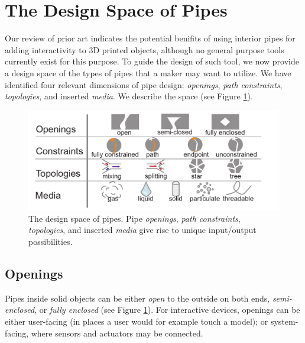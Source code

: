
\section{The Design Space of Pipes}
Our review of prior art indicates the potential benifits of using interior pipes for adding interactivity to 3D printed objects, although no general purpose tools currently exist for this purpose. To guide the design of such tool, we now provide a design space of the types of pipes that a maker may want to utilize. We have identified four relevant dimensions of pipe design: \emph{openings}, \emph{path constraints}, \emph{topologies}, and inserted \emph{media}.  We describe the space (see Figure \ref{fig:pipespace}).

\begin{figure}[t]
\centering
    \includegraphics[width=1.0\columnwidth]{figures/tubespace.pdf}
\caption{The design space of pipes.  Pipe \emph{openings}, \emph{path constraints}, \emph{topologies}, and inserted \emph{media} give rise to unique input/output possibilities.}
\label{fig:pipespace}
\end{figure}

\subsection{Openings}
Pipes inside solid objects can be either \emph{open} to the outside on both ends, \emph{semi-enclosed}, or \emph{fully enclosed} (see Figure \ref{fig:pipespace}). For interactive devices, openings can be either user-facing (in places a user would for example touch a model); or system-facing, where sensors and actuators may be connected.

